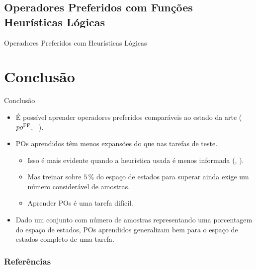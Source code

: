 \documentclass{beamer}
\begin{document}
\subsection{Operadores Preferidos com Funções Heurísticas Lógicas}
\begin{frame}{Operadores Preferidos com Heurísticas Lógicas}

\begin{itemize}
\end{itemize}
\end{frame}


\section{Conclusão}
\begin{frame}{Conclusão}
\begin{itemize}
  \item É possível aprender operadores preferidos \alert{comparáveis ao estado da arte} ($po^{\text{FF}}$, ~\cite{Hoffmann.Nebel/2001,Helmert/2006,Richter.Helmert/2009}).
  \pause
  \item POs aprendidos \pog têm \alert{menos expansões} do que \poff nas tarefas de teste.
  \pause
    \begin{itemize}
      \item Isso é mais evidente quando a heurística usada é menos informada (\hgc, \hblind).
      \pause
      \item Mas treinar sobre $5\,\%$ do espaço de estados para superar \poff ainda exige um número considerável de amostras.
      \pause
      \item Aprender POs é uma tarefa \alert{difícil}.
    \end{itemize}
  \pause
  \item Dado um conjunto com número de amostras representando uma porcentagem do espaço de estados, POs aprendidos \alert{generalizam bem} para o espaço de estados completo de uma tarefa.
\end{itemize}
\end{frame}

\begin{frame}[allowframebreaks]
\frametitle{Referências}
\printbibliography
\end{frame}
\end{document}
